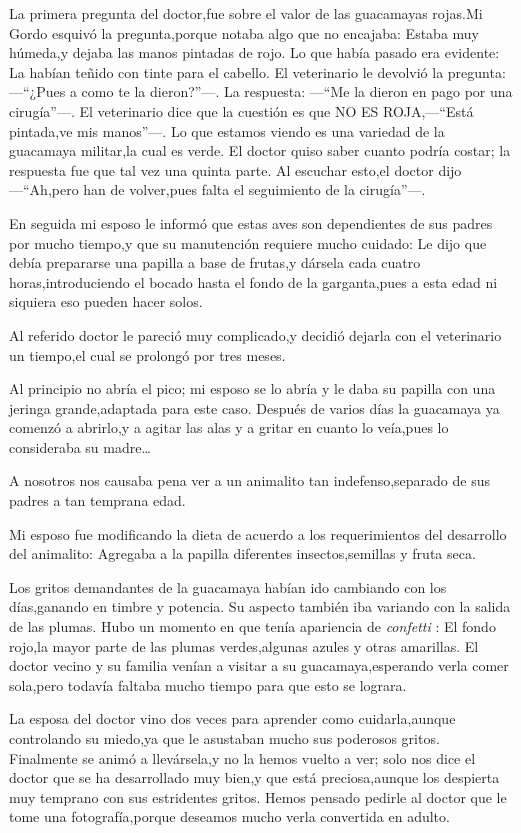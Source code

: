\documentclass[letterpaper,12pt]{book}
\begin{document}
La primera pregunta del doctor,fue sobre el valor de las guacamayas rojas.Mi Gordo esquivó la pregunta,porque notaba algo que no encajaba: Estaba muy húmeda,y dejaba las manos pintadas de rojo. Lo que había pasado era evidente: La habían teñido con tinte para el cabello. El veterinario le devolvió la pregunta: ---``¿Pues a como te la dieron?''---. La respuesta: ---``Me la dieron en pago por una cirugía''---. El veterinario dice que la cuestión es que NO ES ROJA,---``Está pintada,ve mis manos''---. Lo que estamos viendo es una variedad de la guacamaya militar,la cual es verde. El doctor quiso saber cuanto podría costar; la respuesta fue que tal vez una quinta parte. Al escuchar esto,el doctor dijo ---``Ah,pero han de volver,pues falta el seguimiento de la cirugía''---.

En seguida mi esposo le informó que estas aves son dependientes de sus padres por mucho tiempo,y que su manutención requiere mucho cuidado: Le dijo que debía prepararse una papilla a base de frutas,y dársela cada cuatro horas,introduciendo el bocado hasta el fondo de la garganta,pues a esta edad ni siquiera eso pueden hacer solos.

Al referido doctor le pareció muy complicado,y decidió dejarla con el veterinario un tiempo,el cual se prolongó por tres meses. 

Al principio no abría el pico; mi esposo se lo abría y le daba su papilla con una jeringa grande,adaptada para este caso. Después de varios días la guacamaya ya comenzó a abrirlo,y a agitar las alas y a gritar en cuanto lo veía,pues lo consideraba su madre\ldots

A nosotros nos causaba pena ver a un animalito tan indefenso,separado de sus padres a tan temprana edad. 

Mi esposo fue modificando la dieta de acuerdo a los requerimientos del desarrollo del animalito: Agregaba a la papilla diferentes insectos,semillas y fruta seca. 

Los gritos demandantes de la guacamaya habían ido cambiando con los días,ganando en timbre y potencia. Su aspecto también iba variando con la salida de las plumas. Hubo un momento en que tenía apariencia de {\it confetti}\/  : El fondo rojo,la mayor parte de las plumas verdes,algunas azules y otras amarillas. El doctor vecino y su familia venían a visitar a su guacamaya,esperando verla comer sola,pero todavía faltaba mucho tiempo para que esto se lograra. 

La esposa del doctor vino dos veces para aprender como cuidarla,aunque controlando su miedo,ya que le asustaban mucho sus poderosos gritos. Finalmente se animó a llevársela,y no la hemos vuelto a ver; solo nos dice el doctor que se ha desarrollado muy bien,y que está preciosa,aunque los despierta muy temprano con sus estridentes gritos. Hemos pensado pedirle al doctor que le tome una fotografía,porque deseamos mucho verla convertida en adulto.
\end{document}
